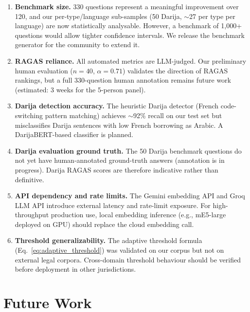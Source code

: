\documentclass[12pt,a4paper]{article}
\begin{document}
\begin{enumerate}[leftmargin=*]

\item \textbf{Benchmark size.}
330 questions represent a meaningful improvement over 120, and our per-type/language
sub-samples (50 Darija, $\sim$27 per type per language) are now statistically
analysable. However, a benchmark of 1,000+ questions would allow tighter confidence
intervals. We release the benchmark generator for the community to extend it.

\item \textbf{RAGAS reliance.}
All automated metrics are LLM-judged. Our preliminary human evaluation ($n=40$,
$\alpha=0.71$) validates the direction of RAGAS rankings, but a full 330-question
human annotation remains future work (estimated: 3 weeks for the 5-person panel).

\item \textbf{Darija detection accuracy.}
The heuristic Darija detector (French code-switching pattern matching) achieves
$\sim$92\% recall on our test set but misclassifies Darija sentences with low
French borrowing as Arabic. A DarijaBERT-based classifier is planned.

\item \textbf{Darija evaluation ground truth.}
The 50 Darija benchmark questions do not yet have human-annotated ground-truth
answers (annotation is in progress). Darija RAGAS scores are therefore indicative
rather than definitive.

\item \textbf{API dependency and rate limits.}
The Gemini embedding API and Groq LLM API introduce external latency and rate-limit
exposure. For high-throughput production use, local embedding inference
(e.g., mE5-large deployed on GPU) should replace the cloud embedding call.

\item \textbf{Threshold generalizability.}
The adaptive threshold formula (Eq.~\ref{eq:adaptive_threshold}) was validated on
our corpus but not on external legal corpora. Cross-domain threshold behaviour
should be verified before deployment in other jurisdictions.

\end{enumerate}

\section{Future Work}
\label{sec:future}
\end{document}
